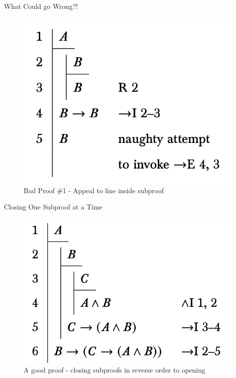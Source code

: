 \documentclass[
  ignorenonframetext,
]{beamer}
\renewcommand{\,}{\text{, }}
\begin{document}
\begin{frame}{What Could go Wrong?!}
\protect\hypertarget{what-could-go-wrong}{}
\begin{figure}
\centering
\includegraphics[width=\textwidth,height=0.65\textheight]{5_1a.png}
\caption{Bad Proof \#1 - Appeal to line inside subproof}
\end{figure}
\end{frame}

\begin{frame}{Closing One Subproof at a Time}
\protect\hypertarget{closing-one-subproof-at-a-time}{}
\begin{figure}
\centering
\includegraphics[width=\textwidth,height=0.65\textheight]{5_1b.png}
\caption{A good proof - closing subproofs in reverse order to opening}
\end{figure}
\end{frame}
\end{document}
